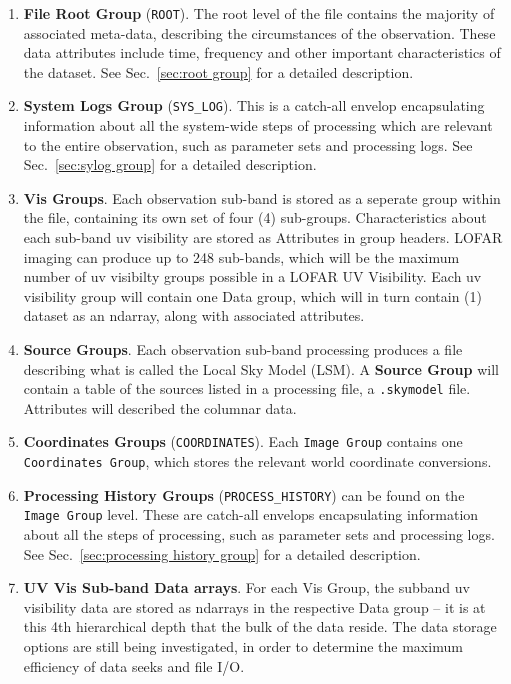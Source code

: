 \documentclass[a4paper,10pt,bibtotoc]{scrartcl}
\begin{document}
\begin{enumerate} \parskip 0pt
\item \textbf{File Root Group} (\verb|ROOT|). The root level of the file contains
  the majority of associated meta-data, describing the circumstances
  of the observation. These data attributes include time, frequency
  and other important characteristics of the dataset. See
  Sec.~\ref{sec:root group} for a detailed description.
  
\item \textbf{System Logs Group} (\verb|SYS_LOG|). This is a catch-all
  envelop encapsulating information about all the system-wide steps of
  processing which are relevant to the entire observation, such as
  parameter sets and processing logs. See Sec.~\ref{sec:sylog group}
  for a detailed description.

\item \textbf{Vis Groups}. Each observation sub-band is stored as a
  seperate group within the file, containing its own set of four (4)
  sub-groups.  Characteristics about each sub-band uv visibility are
  stored as Attributes in group headers.  LOFAR imaging can produce up
  to 248 sub-bands, which will be the maximum number of uv visibilty
  groups possible in a LOFAR UV Visibility.  Each uv visibility group
  will contain one Data group, which will in turn contain (1) dataset
  as an ndarray, along with associated attributes.

\item \textbf{Source Groups}.  Each observation sub-band processing
  produces a file describing what is called the Local Sky Model (LSM).
  A \textbf{Source Group}  will contain a table of the sources listed
  in a processing file, a \verb|.skymodel| file. Attributes will described
  the columnar data. 

\item \textbf{Coordinates Groups} (\verb|COORDINATES|). Each
  \texttt{Image Group} contains one \texttt{Coordinates Group}, which
  stores the relevant world coordinate conversions.

\item \textbf{Processing History Groups} (\verb|PROCESS_HISTORY|)
  can be found on the \texttt{Image Group} level. These are catch-all
  envelops encapsulating information about all the steps of
  processing, such as parameter sets and processing logs. See
  Sec.~\ref{sec:processing history group} for a detailed description.

\item \textbf{UV Vis Sub-band Data arrays}. For each Vis Group, the
  subband uv visibility data are stored as ndarrays in the respective
  Data group -- it is at this 4th hierarchical depth that the bulk of
  the data reside. The data storage options are still being
  investigated, in order to determine the maximum efficiency of data
  seeks and file I/O.
\end{enumerate}
\end{document}
